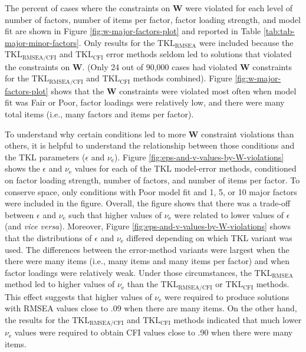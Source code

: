 \documentclass[11pt]{umnthesis}
\begin{document}
The percent of cases where the constraints on \(\mathbf{W}\) were violated for each level of number of factors, number of items per factor, factor loading strength, and model fit are shown in Figure \ref{fig:w-major-factors-plot} and reported in Table \ref{tab:tab-major-minor-factors}. Only results for the \(\textrm{TKL}_{\textrm{RMSEA}}\) were included because the \(\textrm{TKL}_{\textrm{RMSEA/CFI}}\) and \(\textrm{TKL}_{\textrm{CFI}}\) error methods seldom led to solutions that violated the constraints on \(\mathbf{W}\). (Only 24 out of 90,000 cases had violated \(\mathbf{W}\) constraints for the \(\textrm{TKL}_{\textrm{RMSEA/CFI}}\) and \(\textrm{TKL}_{\textrm{CFI}}\) methods combined). Figure \ref{fig:w-major-factors-plot} shows that the \(\mathbf{W}\) constraints were violated most often when model fit was Fair or Poor, factor loadings were relatively low, and there were many total items (i.e., many factors and items per factor).

To understand why certain conditions led to more \(\mathbf{W}\) constraint violations than others, it is helpful to understand the relationship between those conditions and the TKL parameters (\(\epsilon\) and \(\nu_{\textrm{e}}\)). Figure \ref{fig:eps-and-v-values-by-W-violations} shows the \(\epsilon\) and \(\nu_{\textrm{e}}\) values for each of the TKL model-error methods, conditioned on factor loading strength, number of factors, and number of items per factor. To conserve space, only conditions with Poor model fit and 1, 5, or 10 major factors were included in the figure. Overall, the figure shows that there was a trade-off between \(\epsilon\) and \(\nu_{\textrm{e}}\) such that higher values of \(\nu_{\textrm{e}}\) were related to lower values of \(\epsilon\) (and \emph{vice versa}). Moreover, Figure \ref{fig:eps-and-v-values-by-W-violations} shows that the distributions of \(\epsilon\) and \(\nu_{\textrm{e}}\) differed depending on which TKL variant was used. The differences between the error-method variants were largest when the there were many items (i.e., many items and many items per factor) and when factor loadings were relatively weak. Under those circumstances, the \(\textrm{TKL}_\textrm{RMSEA}\) method led to higher values of \(\nu_{\textrm{e}}\) than the \(\textrm{TKL}_\textrm{RMSEA/CFI}\) or \(\textrm{TKL}_\textrm{CFI}\) methods. This effect suggests that higher values of \(\nu_{\textrm{e}}\) were required to produce solutions with RMSEA values close to .09 when there are many items. On the other hand, the results for the \(\textrm{TKL}_\textrm{RMSEA/CFI}\) and \(\textrm{TKL}_\textrm{CFI}\) methods indicated that much lower \(\nu_{\textrm{e}}\) values were required to obtain CFI values close to .90 when there were many items.
\end{document}

